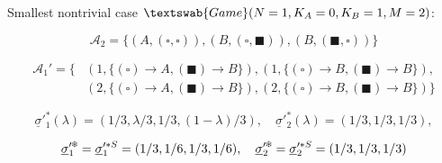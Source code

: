 \documentclass{beamer}
\newcommand{\wb}{\square}
\newcommand{\bb}{\blacksquare}
\theoremstyle{definition}
\newcommand{\G}[1]{$\textswab{Game}(#1)$}
\begin{document}
\begin{frame}{Smallest nontrivial case}
\G{N=1,K_A=0,K_B=1,M=2}:

\begin{equation*}
    \label{eq:SimplestFisher_A2}
    \mathcal{A}_2 = \{ (A, (\wb,\wb)), (B, (\wb,\bb)) ,(B,(\bb,\wb)) \}
\end{equation*}

\begin{equation*}
\begin{split}
\mathcal{A}_1' = \{ 
& (1,\{(\wb) \to A, (\bb) \to B\}), (1,\{(\wb) \to B, (\bb) \to B\}), \\
& (2,\{(\wb) \to A, (\bb) \to B\}), (2,\{(\wb) \to B, (\bb) \to B\})
\}
\end{split}
\end{equation*}

\pause

\begin{equation*}
    \label{eq:SimplestFisherComplete}
    \underline{\sigma}'^*_1(\lambda)=(1/3,\lambda/3,1/3,(1-\lambda)/3), \quad \underline{\sigma}'^*_2(\lambda)=(1/3,1/3,1/3), 
\end{equation*}

\begin{equation*}
    \underline{\sigma}'^{\text{\ding{100}}}_1 = 
    \underline{\sigma}'^{*S}_1=(1/3,1/6,1/3,1/6), \quad 
    \underline{\sigma}'^{\text{\ding{100}}}_2 =
    \underline{\sigma}'^{*S}_2=(1/3,1/3,1/3)
\end{equation*}

\end{frame}
\end{document}
